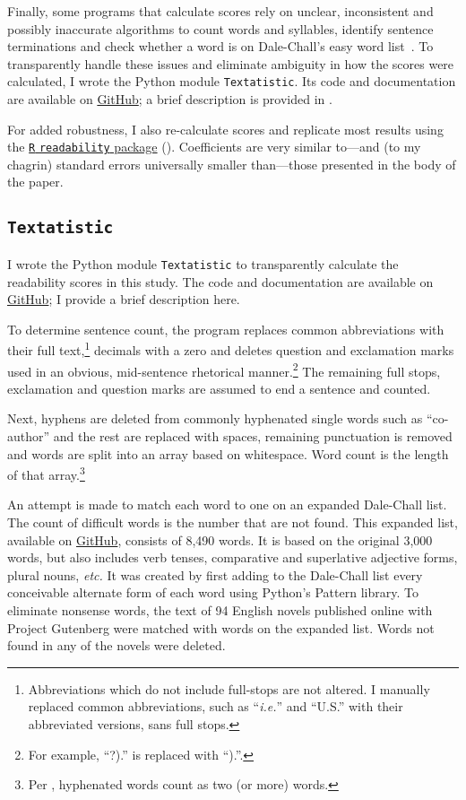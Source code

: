 \begin{appendices}
\begin{refsection}
Finally, some programs that calculate scores rely on unclear, inconsistent and possibly inaccurate algorithms to count words and syllables, identify sentence terminations and check whether a word is on Dale-Chall's easy word list~\citep[for a discussion, see][]{Sirico2007}. To transparently handle these issues and eliminate ambiguity in how the scores were calculated, I wrote the Python module \texttt{Textatistic}. Its code and documentation are available on \href{https://github.com/erinhengel/Textatistic}{GitHub}; a brief description is provided in .

For added robustness, I also re-calculate scores and replicate most results using the \href{https://github.com/trinker/readability}{\texttt{R} \texttt{readability} package} (). Coefficients are very similar to---and (to my chagrin) standard errors universally smaller than---those presented in the body of the paper.

\subsection{\texttt{Textatistic}}
\label{appendixtextatistic}

I wrote the Python module \texttt{Textatistic} to transparently calculate the readability scores in this study. The code and documentation are available on \href{https://github.com/erinhengel/Textatistic}{GitHub}; I provide a brief description here.

To determine sentence count, the program replaces common abbreviations with their full text,\footnote{Abbreviations which do not include full-stops are not altered. I manually replaced common abbreviations, such as ``\emph{i.e.}'' and ``U.S.'' with their abbreviated versions, sans full stops.} decimals with a zero and deletes question and exclamation marks used in an obvious, mid-sentence rhetorical manner.\footnote{For example, ``?).'' is replaced with ``).''.} The remaining full stops, exclamation and question marks are assumed to end a sentence and counted.

Next, hyphens are deleted from commonly hyphenated single words such as ``co-author'' and the rest are replaced with spaces, remaining punctuation is removed and words are split into an array based on whitespace. Word count is the length of that array.\footnote{Per \citet{Chall1995}, hyphenated words count as two (or more) words.}

An attempt is made to match each word to one on an expanded Dale-Chall list. The count of difficult words is the number that are not found. This expanded list, available on \href{https://github.com/erinhengel/Textatistic}{GitHub}, consists of 8,490 words. It is based on the original 3,000 words, but also includes verb tenses, comparative and superlative adjective forms, plural nouns, \emph{etc.} It was created by first adding to the Dale-Chall list every conceivable alternate form of each word using Python's Pattern library. To eliminate nonsense words, the text of 94 English novels published online with Project Gutenberg were matched with words on the expanded list. Words not found in any of the novels were deleted.


\end{refsection}
\end{appendices}
